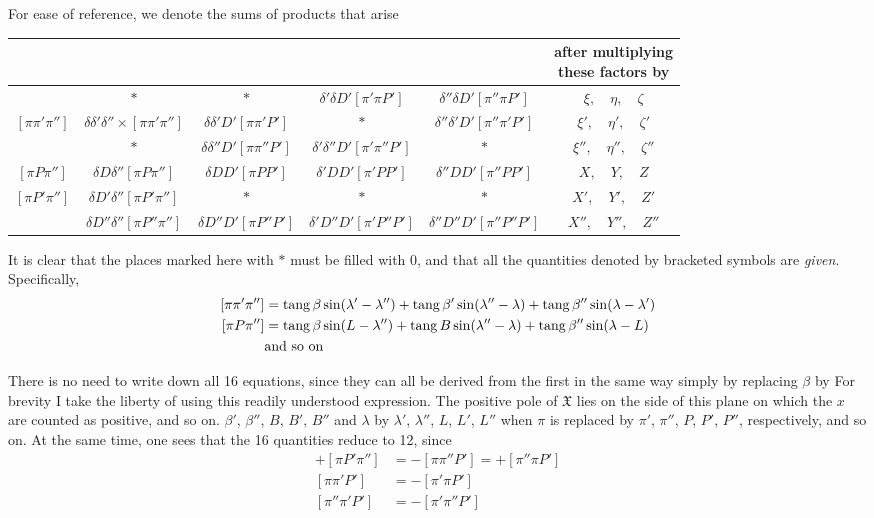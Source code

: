 For ease of reference, we denote the sums of products that arise
\begin{center}\begingroup\fontsize{9}{11}\selectfont\setlength{\tabcolsep}{.8pt}
\begin{tabular}{c|c|c|c|c|c}
&&&&&\shortstack{after multiplying\\these factors by}\\\hline
&$*$&$*$&$\delta'\delta D'[\pi'\pi P']$&$\delta''\delta D'[\pi''\pi P']$&$\xi,\quad\eta,\quad\zeta$\\
$[\pi\pi'\pi'']$&$\delta\delta'\delta''\times[\pi\pi'\pi'']$&$\delta\delta'D'[\pi\pi'P']$&$*$&$\delta''\delta'D'[\pi''\pi'P']$&$\xi',\quad\eta',\quad\zeta'$\\
&$*$&$\delta\delta''D'[\pi\pi''P']$&$\delta'\delta''D'[\pi'\pi''P']$&$*$&$\xi'',\quad\eta'',\quad\zeta''$\\
$[\pi P\pi'']$&$\delta D\delta''[\pi P\pi'']$&$\delta DD'[\pi PP']$&$\delta'DD'[\pi'PP']$&$\delta''DD'[\pi''PP']$&$X,\quad Y,\quad Z$\\
$[\pi P'\pi'']$&$\delta D'\delta''[\pi P'\pi'']$&$*$&$*$&$*$&$X',\quad Y',\quad Z'$\\
&$\delta D''\delta''[\pi P''\pi'']$&$\delta D''D'[\pi P''P']$&$\delta'D''D'[\pi'P''P']$&$\delta''D''D'[\pi''P''P']$&$X'',\quad Y'',\quad Z''$
\end{tabular}\endgroup\end{center}
It is clear that the places marked here with $*$ must be filled with $0$, and that all the quantities denoted by bracketed symbols are \emph{given}. Specifically,
\[
\begin{aligned}\relax
[\pi\pi'\pi'']&=\operatorname{tang}\beta\sin(\lambda'-\lambda'')+\operatorname{tang}\beta'\sin(\lambda''-\lambda)+\operatorname{tang}\beta''\sin(\lambda-\lambda')\\
[\pi P\pi'']&=\operatorname{tang}\beta\sin(L-\lambda'')+\operatorname{tang}B\sin(\lambda''-\lambda)+\operatorname{tang}\beta''\sin(\lambda-L)\\
&\text{and so on}
\end{aligned}
\]

There is no need to write down all 16 equations, since they can all be derived from the first in the same way simply by replacing $\beta$ by
\expandafter\def\csname HistoricalNoteText9\endcsname{For brevity I take the liberty of using this readily understood expression. The positive pole of $\mathfrak{X}$ lies on the side of this plane on which the $x$ are counted as positive, and so on.}%
%
$\beta'$, $\beta''$, $B$, $B'$, $B''$ and $\lambda$ by $\lambda'$, $\lambda''$, $L$, $L'$, $L''$ when $\pi$ is replaced by $\pi'$, $\pi''$, $P$, $P'$, $P''$, respectively, and so on. At the same time, one sees that the 16 quantities reduce to 12, since
\[
\begin{aligned}
+[\pi P'\pi'']&=-[\pi\pi''P']=+[\pi''\pi P']\\
[\pi\pi'P']&=-[\pi'\pi P']\\
[\pi''\pi'P']&=-[\pi'\pi''P']
\end{aligned}
\]

